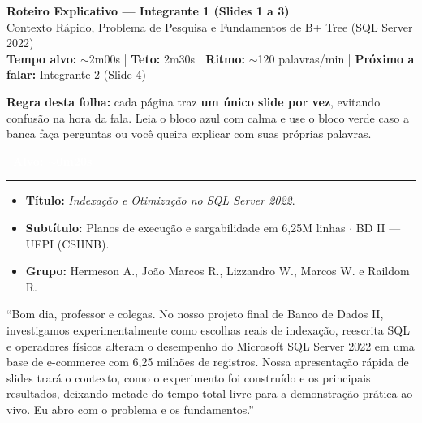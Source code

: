 \documentclass[10pt,a4paper]{article}
\newcommand{\tagTime}[1]{\colorbox{BrandDark}{\textcolor{white}{\textbf{\footnotesize\ #1\ }}}}
\newcommand{\slideHeader}[3]{%
  \noindent{\Large\bfseries\color{BrandDark} Slide #1 — #2}\hfill\tagTime{Alvo: #3}\par
  \vspace{2pt}\noindent\textcolor{BrandAmber}{\rule{\linewidth}{1.3pt}}\par
  \vspace{4pt}
}
\begin{document}
\begin{tcolorbox}[colback=BrandDark,colframe=BrandDark,arc=4pt,left=11pt,right=11pt,top=8pt,bottom=8pt]
  {\Large\bfseries\color{white} Roteiro Explicativo — Integrante 1 (Slides 1 a 3)}\\[3pt]
  {\small\color{BrandLine} Contexto Rápido, Problema de Pesquisa e Fundamentos de B+ Tree (SQL Server 2022)}\\[4pt]
  {\footnotesize\color{white}
    \textbf{Tempo alvo:} $\sim$2m00s \quad|\quad
    \textbf{Teto:} 2m30s \quad|\quad
    \textbf{Ritmo:} $\sim$120 palavras/min \quad|\quad
    \textbf{Próximo a falar:} Integrante 2 (Slide 4)
  }
\end{tcolorbox}

\vspace{4pt}
{\small\color{BrandSlate}\textbf{Regra desta folha:} cada página traz \textbf{um único slide por vez}, evitando confusão na hora da fala. Leia o bloco azul com calma e use o bloco verde caso a banca faça perguntas ou você queira explicar com suas próprias palavras.}

\vspace{8pt}

\slideHeader{1}{Capa e Abertura}{$\sim$0m20s}

\begin{telaBox}
  \begin{itemize}[leftmargin=14pt,itemsep=1pt,topsep=1pt]
    \item \textbf{Título:} \emph{Indexação e Otimização no SQL Server 2022}.
    \item \textbf{Subtítulo:} Planos de execução e sargabilidade em 6,25M linhas $\cdot$ BD II — UFPI (CSHNB).
    \item \textbf{Grupo:} Hermeson A., João Marcos R., Lizzandro W., Marcos W. e Raildom R.
  \end{itemize}
\end{telaBox}

\begin{falaBox}
``Bom dia, professor e colegas. No nosso projeto final de Banco de Dados II, investigamos experimentalmente como escolhas reais de indexação, reescrita SQL e operadores físicos alteram o desempenho do Microsoft SQL Server 2022 em uma base de e-commerce com 6,25 milhões de registros. Nossa apresentação rápida de slides trará o contexto, como o experimento foi construído e os principais resultados, deixando metade do tempo total livre para a demonstração prática ao vivo. Eu abro com o problema e os fundamentos.''
\end{falaBox}
\end{document}
